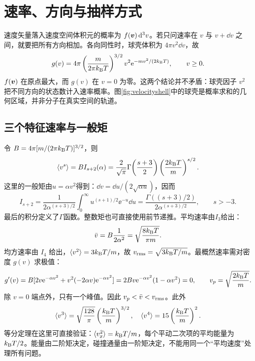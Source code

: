 \section{速率、方向与抽样方式}
\label{th:speed}
速度矢量落入速度空间体积元的概率为 $f(\bm{v})\mathop{}\!\mathrm d^3v$。若只问速率在 $v$ 与 $v+\dd v$ 之间，就要把所有方向相加。各向同性时，球壳体积为 $4\pi v^2\dd v$，故
\begin{equation}\label{eq:speeddensity}
 g(v)=4\pi\left(\frac{m}{2\pi k_{\mathrm B} T}\right)^{3/2}v^2\mathrm e^{-mv^2/(2k_{\mathrm B} T)},\qquad v\ge0.
\end{equation}
$f(\bm{v})$ 在原点最大，而 $g(v)$ 在 $v=0$ 为零。这两个结论并不矛盾：球壳因子 $v^2$ 把不同方向的状态数计入速率概率。图\ref{fig:velocityshell}中的球壳是概率求和的几何区域，并非分子在真实空间的轨道。

\subsection{三个特征速率与一般矩}
\label{th:moments}
令 $B=4\pi[m/(2\pi k_{\mathrm B} T)]^{3/2}$，则
\[
 \langle v^s\rangle=B I_{s+2}(\alpha)
 =\frac2{\sqrt\pi}\Gamma\!\left(\frac{s+3}{2}\right)
 \left(\frac{2k_{\mathrm B} T}{m}\right)^{s/2}.
\]
这里的一般矩由$u=\alpha v^2$得到：$\dd v=\dd u/(2\sqrt{\alpha u})$，因而
\[
 I_{s+2}=\frac1{2\alpha^{(s+3)/2}}
 \int_0^\infty u^{(s+1)/2}\ee^{-u}\dd u
 =\frac{\Gamma((s+3)/2)}{2\alpha^{(s+3)/2}},\qquad s>-3.
\]
最后的积分定义了$\Gamma$函数。整数矩也可直接使用前节递推。平均速率由$I_3$给出：
\[
 \bar v=B\frac1{2\alpha^2}=\sqrt{\frac{8k_{\mathrm B} T}{\pi m}}.
\]
均方速率由 $I_4$ 给出，$\langle v^2\rangle=3k_{\mathrm B} T/m$，故 $v_{\rm rms}=\sqrt{3k_{\mathrm B} T/m}$。最概然速率需对密度 $g(v)$ 求极值：
\[
 g'(v)=B[2v\mathrm e^{-\alpha v^2}+v^2(-2\alpha v)\mathrm e^{-\alpha v^2}]
 =2Bv\mathrm e^{-\alpha v^2}(1-\alpha v^2)=0,
 \qquad v_p=\sqrt{\frac{2k_{\mathrm B} T}{m}}.
\]
除 $v=0$ 端点外，只有一个峰值。因此 $v_p<\bar v<v_{\rm rms}$。此外
\[
 \langle v^3\rangle=\sqrt{\frac{128}\pi}\left(\frac{k_{\mathrm B} T}{m}\right)^{3/2},\quad
 \langle v^4\rangle=15\left(\frac{k_{\mathrm B} T}{m}\right)^2.
\]
等分定理在这里可直接验证：$\langle v_x^2\rangle=k_{\mathrm B} T/m$，每个平动二次项的平均能量为 $k_{\mathrm B} T/2$。能量由二阶矩决定，碰撞通量由一阶矩决定，不能用同一个“平均速度”处理所有问题。

